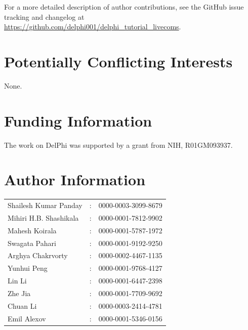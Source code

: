 \documentclass[9pt,tutorial,pubversion]{livecoms}
\newcommand{\githubrepository}{\url{https://github.com/delphi001/delphi_tutorial_livecoms}}  %
\begin{document}
For a more detailed description of author contributions,
see the GitHub issue tracking and changelog at \githubrepository.

\section{Potentially Conflicting Interests}

None.

\section{Funding Information}
The work on DelPhi was supported by a grant from NIH, R01GM093937. 

\section*{Author Information}
\makeorcid
\begin{tabular}{lcl}
	Shailesh Kumar Panday  &:& 0000-0003-3099-8679 \\
	Mihiri H.B. Shashikala &:& 0000-0001-7812-9902 \\
	Mahesh Koirala         &:& 0000-0001-5787-1972 \\
	Swagata Pahari         &:& 0000-0001-9192-9250 \\
	Arghya Chakrvorty      &:& 0000-0002-4467-1135 \\
	Yunhui Peng            &:& 0000-0001-9768-4127 \\
	Lin Li                 &:& 0000-0001-6447-2398 \\
	Zhe Jia                &:& 0000-0001-7709-9692 \\
	Chuan Li               &:& 0000-0003-2414-4781 \\
	Emil Alexov            &:& 0000-0001-5346-0156 \\
\end{tabular}




\end{document}
